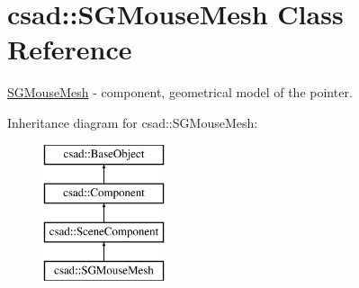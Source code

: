 \hypertarget{classcsad_1_1_s_g_mouse_mesh}{\section{csad\-:\-:S\-G\-Mouse\-Mesh Class Reference}
\label{classcsad_1_1_s_g_mouse_mesh}
}


\hyperlink{classcsad_1_1_s_g_mouse_mesh}{S\-G\-Mouse\-Mesh} -\/ component, geometrical model of the pointer.  


Inheritance diagram for csad\-:\-:S\-G\-Mouse\-Mesh\-:\begin{figure}[H]
\begin{center}
\leavevmode
\includegraphics[height=4.000000cm]{classcsad_1_1_s_g_mouse_mesh}
\end{center}
\end{figure}
